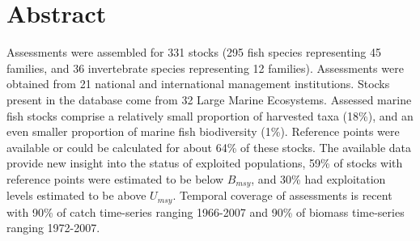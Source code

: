 \section*{Abstract}

Assessments were assembled for 331 stocks
(295 fish species representing
45 families, and 36
invertebrate species representing 12
families). Assessments were obtained from 21 national
and international management institutions. Stocks
present in the database come from 32 Large
Marine Ecosystems. Assessed marine fish stocks
comprise a relatively small proportion of harvested taxa
(18\%), and an even smaller proportion of
marine fish biodiversity (1\%). Reference
points were available or could be calculated for about
64\% of these stocks. The available data
provide new insight into the status of exploited populations,
59\% of stocks with reference points
were estimated to be below $B_{msy}$, and
30\% had exploitation levels
estimated to be above $U_{msy}$. Temporal coverage of assessments is
recent with 90\% of catch time-series ranging 1966-2007
and 90\% of biomass time-series ranging 1972-2007.


